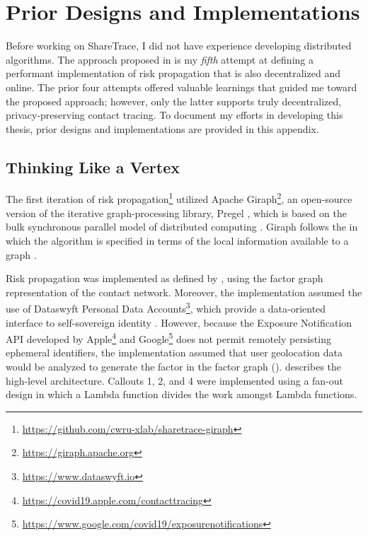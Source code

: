 \chapter{Prior Designs and Implementations}\label{ch:previous-designs}

Before working on ShareTrace, I did not have experience developing distributed algorithms. The approach proposed in  is my \emph{fifth} attempt at defining a performant implementation of risk propagation that is also decentralized and online. The prior four attempts offered valuable learnings that guided me toward the proposed approach; however, only the latter supports truly decentralized, privacy-preserving contact tracing. To document my efforts in developing this thesis, prior designs and implementations are provided in this appendix.

\section{Thinking Like a Vertex}\label{sec:giraph}

The first iteration of risk propagation\footnote{\url{https://github.com/cwru-xlab/sharetrace-giraph}} utilized Apache Giraph\footnote{\url{https://giraph.apache.org}}, an open-source version of the iterative graph-processing library, Pregel \citep{Malewicz2010}, which is based on the bulk synchronous parallel model of distributed computing \citep{Valiant1990}. Giraph follows the  in which the algorithm is specified in terms of the local information available to a graph \vertexName \citep{McCune2015}.

Risk propagation was implemented as defined by \citet{Ayday2020,Ayday2021}, using the factor graph representation of the contact network. Moreover, the implementation assumed the use of Dataswyft Personal Data Accounts\footnote{\url{https://www.dataswyft.io}}, which provide a data-oriented interface to self-sovereign identity \citep[pp. 98--99]{Preukschat2021}. However, because the Exposure Notification API developed by Apple\footnote{\url{https://covid19.apple.com/contacttracing}} and Google\footnote{\url{https://www.google.com/covid19/exposurenotifications}} does not permit remotely persisting ephemeral identifiers, the implementation assumed that user geolocation data would be analyzed to generate the factor \verticesName in the factor graph ().  describes the high-level architecture. Callouts 1, 2, and 4 were implemented using a fan-out design in which a  Lambda function divides the work amongst  Lambda functions.

